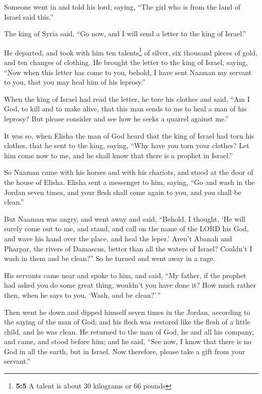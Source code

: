  Someone went in and told his lord, saying, ``The girl who
is from the land of Israel said this.''

 The king of Syria said, ``Go now, and I will send a
letter to the king of Israel.''

He departed, and took with him ten talents\footnote{\textbf{5:5} A
  talent is about 30 kilograms or 66 pounds} of silver, six thousand
pieces of gold, and ten changes of clothing.  He brought
the letter to the king of Israel, saying, ``Now when this letter has
come to you, behold, I have sent Naaman my servant to you, that you may
heal him of his leprosy.''

 When the king of Israel had read the letter, he tore his
clothes and said, ``Am I God, to kill and to make alive, that this man
sends to me to heal a man of his leprosy? But please consider and see
how he seeks a quarrel against me.''

 It was so, when Elisha the man of God heard that the king
of Israel had torn his clothes, that he sent to the king, saying, ``Why
have you torn your clothes? Let him come now to me, and he shall know
that there is a prophet in Israel.''

 So Naaman came with his horses and with his chariots, and
stood at the door of the house of Elisha.  Elisha sent a
messenger to him, saying, ``Go and wash in the Jordan seven times, and
your flesh shall come again to you, and you shall be clean.''

 But Naaman was angry, and went away and said, ``Behold,
I thought, `He will surely come out to me, and stand, and call on the
name of the LORD his God, and wave his hand over the place, and heal the
leper.'  Aren't Abanah and Pharpar, the rivers of
Damascus, better than all the waters of Israel? Couldn't I wash in them
and be clean?'' So he turned and went away in a rage.

 His servants came near and spoke to him, and said, ``My
father, if the prophet had asked you do some great thing, wouldn't you
have done it? How much rather then, when he says to you, `Wash, and be
clean?'\,''

 Then went he down and dipped himself seven times in the
Jordan, according to the saying of the man of God; and his flesh was
restored like the flesh of a little child, and he was clean.
 He returned to the man of God, he and all his company,
and came, and stood before him; and he said, ``See now, I know that
there is no God in all the earth, but in Israel. Now therefore, please
take a gift from your servant.''

